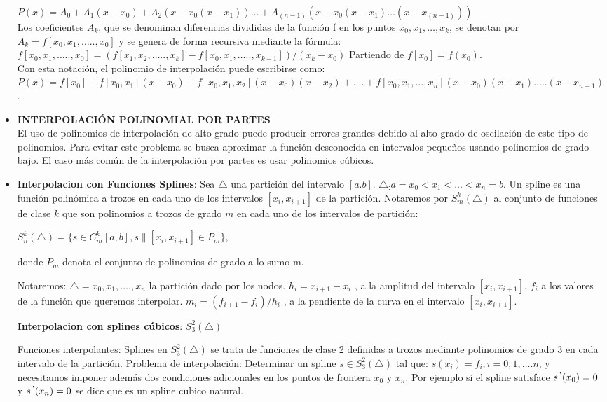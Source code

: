 \documentclass[10pt,a4paper]{article}
\begin{document}
\begin{multicols}{2}
\begin{itemize}
	$P(x)=A_0+A_1 (x-x_0 )+A_2 (x-x_0 (x-x_1 ))…+A_(n-1) (x-x_0 (x-x_1 )…(x-x_(n-1) )) $\\
	Los coeficientes  $A_k$, que se denominan diferencias divididas de la función f en los puntos $x_0,x_1,…, x_k$, se denotan por $A_k=f [x_0,x_1,…..,x_0]$ y se genera de forma recursiva mediante la fórmula: \\
	$f [x_0,x_1,…..,x_0 ]=(f [x_1,x_2,…..,x_k ]-f [x_0,x_1,…..,x_{k-1}]  )/(x_k-x_0 )$
	Partiendo de $f [x_0]=f (x_0)$.\\
	Con esta notación, el polinomio de interpolación puede escribirse como:\\
	$P(x)= f [x_0 ]+f [x_0,x_1]( x-x_0)+ f [x_0,x_1,x_2]( x-x_0) ( x-x_2)+….+ f [x_0,x_1,…,x_n]( x-x_0) ( x-x_1)….. ( x-x_{n-1})$.
	\item \textbf{INTERPOLACIÓN POLINOMIAL POR PARTES}\\
	El uso de polinomios de interpolación de alto grado puede producir errores grandes debido al alto grado de oscilación de este tipo de polinomios. Para evitar este problema se busca aproximar    la  función  desconocida  en  intervalos  pequeños  usando  polinomios  de  grado bajo. El caso más común de la interpolación por partes es usar polinomios cúbicos. 
	\item \textbf{Interpolacion con Funciones Splines}:
	Sea $\triangle$ una partición del intervalo $[a.b]$.
	$\triangle _:  a=x_0<x_1<...<x_n=b$.
	Un spline es una función polinómica a trozos en cada uno de los intervalos $[x_i,x_{i+1}]$ de la partición.
	Notaremos por $S_m^k (\triangle)$ al conjunto de funciones de clase $k$ que son polinomios a trozos de grado $m$ en cada uno de los intervalos de partición:
	
	$S_n^k (\triangle)=\{ s\in C_m^k  [a,b] , s \|[x_i,x_{i+1} ]\in P_m\}$,
	
	donde $P_m$ denota el conjunto de polinomios de grado a lo sumo m.
	
	Notaremos:
	$\triangle={x_0,x_1,….,x_n  }$ la partición dado por los nodos.
	$h_i=x_{i+1}-x_i$ , a la amplitud del intervalo $[x_i,x_{i+1}]$.
	$f_i$ a los valores de la función que queremos interpolar.
	$m_i=(f_{i+1}-f_i)/h_i$ , a la pendiente de la curva en el intervalo $[x_i,x_{i+1}]$.
	
	\textbf{Interpolacion con splines cúbicos}: $S_3^2 (\triangle)$
	
	Funciones interpolantes: Splines en $S_3^2 (\triangle)$ se trata de funciones de clase 2 definidas a trozos mediante polinomios de grado 3 en cada intervalo de la partición. 
	Problema de interpolación: Determinar un spline $s\in S_3^2 (\triangle)$ tal que:
	$s (x_i )=f_i, i=0,1,….n$, y necesitamos imponer además dos condiciones adicionales en los puntos de frontera $x_0$ y $x_n$. Por ejemplo si el spline satisface  $s^" (x_0 )=0$ y $s^" (x_n )=0$ se dice que es un spline cubico natural.
	

\end{itemize}
\end{multicols}
\end{document}
